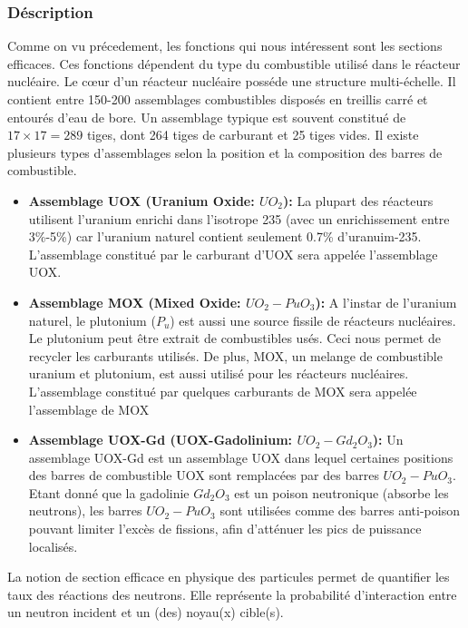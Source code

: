 \subsubsection{Déscription}
\hspace{0.5cm}
Comme on vu précedement, les fonctions qui nous intéressent sont les sections efficaces. Ces fonctions dépendent du type du combustible utilisé dans le réacteur nucléaire.
Le cœur d'un réacteur nucléaire posséde une structure multi-échelle. Il contient entre 150-200 assemblages combustibles disposés en treillis carré
et entourés d'eau de bore. Un assemblage typique est souvent constitué de $17 \times 17=289$ tiges, dont 264 tiges de carburant et 25 tiges vides.
Il existe plusieurs types d'assemblages selon la position et la composition des barres de combustible.
\begin{itemize}
\item \textbf{Assemblage UOX (Uranium Oxide: $UO_2$):}
La plupart des réacteurs utilisent l'uranium enrichi dans l'isotrope 235 (avec un enrichissement entre 3\%-5\%) car l'uranium naturel contient seulement 0.7\% d'uranuim-235.
L'assemblage constitué par le carburant d'UOX sera appelée l'assemblage UOX.
\item \textbf{Assemblage MOX (Mixed Oxide: $UO_2-PuO_3$):}
A l'instar de l'uranium naturel, le plutonium ($P_u$) est aussi une source fissile de réacteurs nucléaires.
Le plutonium peut être extrait de combustibles usés. Ceci nous permet de recycler les carburants utilisés.
De plus, MOX, un melange de combustible uranium et plutonium, est aussi utilisé pour les réacteurs nucléaires.
L'assemblage constitué par quelques carburants de MOX sera appelée l'assemblage de MOX
\item \textbf{Assemblage UOX-Gd (UOX-Gadolinium: $UO_2-Gd_2O_3$):}
Un assemblage UOX-Gd est un assemblage UOX dans lequel certaines positions des barres de combustible UOX sont remplacées par des barres $UO_2-PuO_3$.
Etant donné que la gadolinie $Gd_2O_3$ est un poison neutronique (absorbe les neutrons), les barres $UO_2-PuO_3$ sont utilisées comme des barres anti-poison
pouvant limiter l'excès de fissions, afin d'atténuer les pics de puissance localisés.
\end{itemize}
\vspace{0.5cm}
\hspace{0.5cm}
La notion de section efficace en physique des particules permet de quantifier les taux des réactions des neutrons. Elle représente la probabilité d'interaction entre un neutron incident et un (des) noyau(x) cible(s).
